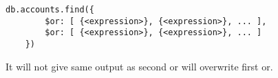 \documentclass[../main.tex]{subfiles}
\begin{document}
\begin{lstlisting}[language=MongoDB]
	db.accounts.find({
		$or: [ {<expression>}, {<expression>}, ... ],
		$or: [ {<expression>}, {<expression>}, ... ]
	})
\end{lstlisting}
It will not give same output as second or will overwrite first or.


\printglossaries
\end{document}
